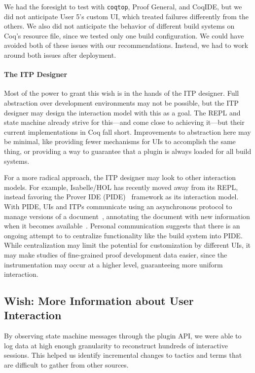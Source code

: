 We had the foresight to test \toolname with \lstinline{coqtop}, 
Proof General, and CoqIDE, but we did not anticipate User 5's custom
UI, which treated failures differently from the others.
We also did not anticipate the behavior of different
build systems on Coq's resource file, since we tested only one
build configuration.
We could have avoided both of these issues with our recommendations.
Instead, we had to work around both issues after deployment.

\paragraph{The ITP Designer} 
Most of the power to grant this wish is in the hands of the ITP designer.
Full abstraction over development environments may not be possible, but the
ITP designer may design the interaction model with this as a goal.
The REPL and state machine already strive for this---and come
close to achieving it---but their current implementations in Coq fall short.
Improvements to abstraction here may be minimal, like
providing fewer mechanisms for UIs to accomplish the same thing,
or providing a way to guarantee that a plugin is always loaded for all
build systems.

For a more radical approach, the ITP designer may look to other 
interaction models.
For example, Isabelle/HOL has recently moved away from its REPL,
instead favoring the Prover IDE (PIDE)~\cite{Wenzel2012} framework
as its interaction model.
With PIDE, UIs and ITPs communicate using an asynchronous protocol to manage
versions of a document~\cite{Wenzel2014}, annotating the document with 
new information when it becomes available~\cite{Wenzel2012}.
Personal communication suggests that there is an ongoing attempt to 
to centralize functionality like the build system into PIDE.
While centralization may limit the potential for customization by different
UIs, it may make studies of fine-grained proof development data easier,
since the instrumentation may occur at a higher level,
guaranteeing more uniform interaction.

\subsection{Wish: More Information about User Interaction}
\label{sec:wish2}

By observing state machine messages through the plugin API,
we were able to log data at high enough granularity to reconstruct
hundreds of interactive sessions. This helped us identify incremental
changes to tactics and terms that are difficult to gather from other sources.

